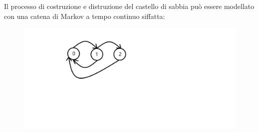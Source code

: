 \documentclass[12pt]{homework}
\begin{document}
\section{}%
\begin{alphaparts}
    \questionpart
 Il processo di costruzione e distruzione del castello di sabbia può essere modellato con una catena di Markov a tempo continuo siffatta:                                                                        
 
\begin{figure}[htb]\centering
\includegraphics[scale=0.50]{catenaex2}
  \end{figure}
  

\end{alphaparts}
\end{document}
